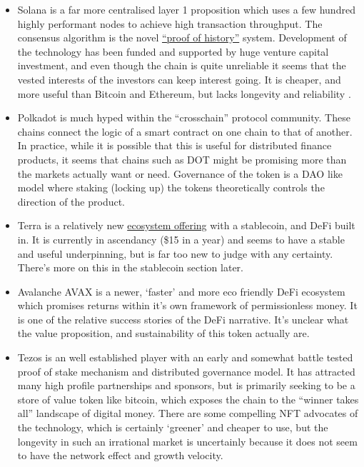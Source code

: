 \begin{itemize}
\item Solana is a far more centralised layer 1 proposition which uses a few hundred highly performant nodes to achieve high transaction throughput. The consensus algorithm is the novel \href{https://solana.com/solana-whitepaper.pdf}{``proof of history''} system. Development of the technology has been funded and supported by huge venture capital investment, and even though the chain is quite unreliable it seems that the vested interests of the investors can keep interest going. It is cheaper, and more useful than Bitcoin and Ethereum, but lacks longevity and reliability . 
\item Polkadot is much hyped within the ``crosschain'' protocol community. These chains connect the logic of a smart contract on one chain to that of another. In practice, while it is possible that this is useful for distributed finance products, it seems that chains such as DOT might be promising more than the markets actually want or need. Governance of the token is a DAO like model where staking (locking up) the tokens theoretically controls the direction of the product.
\item Terra is a relatively new \href{https://assets.website-files.com/611153e7af981472d8da199c/618b02d13e938ae1f8ad1e45_Terra_White_paper.pdf}{ecosystem offering} with a stablecoin, and DeFi built in. It is currently in ascendancy (\$15 in a year) and seems to have a stable and useful underpinning, but is far too new to judge with any certainty. There's more on this in the stablecoin section later.
\item Avalanche AVAX is a newer, `faster' and more eco friendly DeFi ecosystem which promises returns within it's own framework of permissionless money. It is one of the relative success stories of the DeFi narrative. It's unclear what the value proposition, and sustainability of this token actually are.
\item Tezos is an well established player with an early and somewhat battle tested proof of stake mechanism and distributed governance model. It has attracted many high profile partnerships and sponsors, but is primarily seeking to be a store of value token like bitcoin, which exposes the chain to the ``winner takes all'' landscape of digital money. There are some compelling NFT advocates of the technology, which is certainly `greener' and cheaper to use, but the longevity in such an irrational market is uncertainly because it does not seem to have the network effect and growth velocity. 

\end{itemize}
